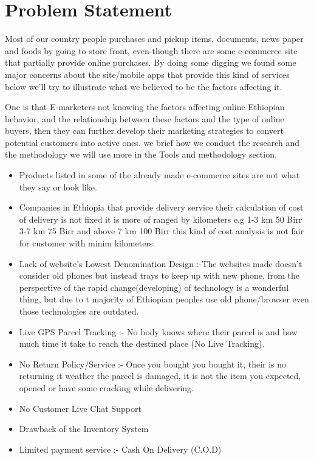\section{Problem Statement}
Most of our country people purchases and pickup items, documents, news paper and foods by going to store front, even-though there are some e-commerce site that partially provide online purchases. By doing some digging we found some major concerns about the site/mobile apps that provide this kind of services below we’ll try to illustrate what we believed to be the factors affecting it.

One is that E-marketers not knowing the factors affecting online Ethiopian behavior, and the relationship between these factors and the type of online buyers, then they can further develop their marketing strategies to convert potential customers into active ones. we brief how we conduct the research and the methodology we will use more in the Tools and methodology section.

\begin{itemize}

	\item Products listed in some of the already made e-commerce sites are not what they say or look like. 

	\item Companies in Ethiopia that provide delivery service their calculation of cost of delivery is not fixed it is more of ranged by kilometers e.g 1-3 km 50 Birr 3-7 km 75 Birr and above 7 km 100 Birr this kind of cost analysis is not fair for customer with minim kilometers.

	\item Lack of website's Lowest Denomination Design :-The websites made doesn’t consider old phones but instead trays to keep up with new phone, from the perspective of the rapid change(developing) of technology is a wonderful thing, but due to t majority of Ethiopian peoples use old phone/browser even those technologies are outdated.

	\item Live GPS Parcel Tracking :- No body knows where their parcel is and how much time it take to reach the destined place (No Live Tracking).

	\item No Return Policy/Service :- Once you bought you bought it, their is no returning it weather the parcel is damaged, it is not the item you expected, opened or have some cracking while delivering.

	\item No Customer Live Chat Support

	\item Drawback of the Inventory System

	\item Limited payment service :- Cash On Delivery (C.O.D)

\end{itemize}

